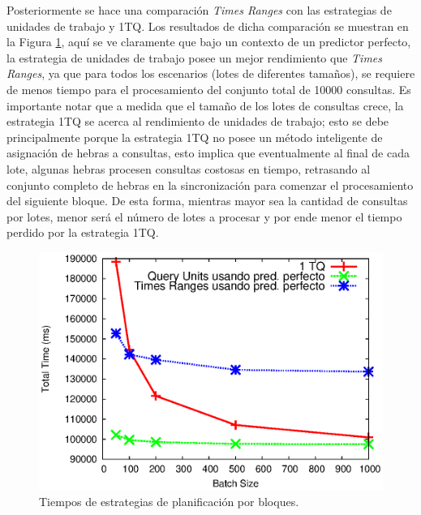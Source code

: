 
Posteriormente se hace una comparación \textit{Times Ranges} con las estrategias de unidades de trabajo y 1TQ. Los resultados de dicha comparación se muestran en la Figura \ref{fig:units_vs_multithread}, aquí se ve claramente que bajo un contexto de un predictor perfecto, la estrategia de unidades de trabajo posee un mejor rendimiento que \textit{Times Ranges}, ya que para todos los escenarios (lotes de diferentes tamaños), se requiere de menos tiempo para el procesamiento del conjunto total de 10000 consultas.
Es importante notar que a medida que el tamaño de los lotes de consultas crece, la estrategia 1TQ se acerca al rendimiento de unidades de trabajo; esto se debe principalmente porque la estrategia 1TQ no posee un método inteligente de asignación de hebras a consultas, esto implica que eventualmente al final de cada lote, algunas hebras procesen consultas costosas en tiempo, retrasando al conjunto completo de hebras en la sincronización para comenzar el procesamiento del siguiente bloque. De esta forma, mientras mayor sea la cantidad de consultas por lotes, menor será el número de lotes a procesar y por ende menor el tiempo perdido por la estrategia 1TQ.  

\begin{figure}[tp]
\centering
\includegraphics[scale=.75]{images/units_vs_multithread.eps}
\caption{Tiempos de estrategias de planificación por bloques.}
\label{fig:units_vs_multithread}
\end{figure}
